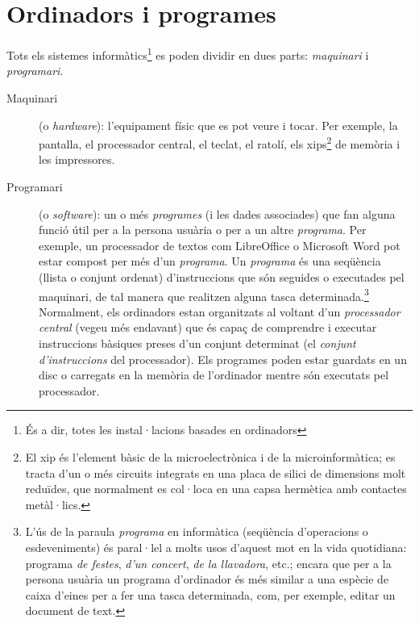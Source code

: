 \chapter{Ordinadors i programes}

\label{se:OiP}

Tots els sistemes informàtics\footnote{És a dir, totes les
  instal·lacions basades en ordinadors} es poden dividir en dues
parts: \emph{maquinari} i \emph{programari}.

\begin{description}
\item[Maquinari] (o \emph{hardware}): l'equipament físic que es pot
  veure i tocar. Per exemple, la pantalla, el processador central, el
  teclat, el ratolí, els xips\footnote{El xip és l'element bàsic de la
    microelectrònica i de la microinformàtica; es tracta d'un o més
    circuits integrats en una placa de silici de dimensions molt
    reduïdes, que normalment es col·loca en una capsa hermètica amb
    contactes metàl·lics.}  de memòria i les impressores.

\item[Programari] (o \emph{software}): un o més \emph{programes} (i
  les dades associades) que fan alguna funció útil per a la persona
  usuària o per a un altre \emph{programa}.  Per exemple, un
  processador de textos com LibreOffice o Microsoft Word pot estar
  compost per més d'un \emph{programa}. Un \emph{programa} és una
  seqüència (llista o conjunt ordenat) d'instruccions que són seguides
  o executades pel maquinari, de tal manera que realitzen alguna tasca
  determinada.\footnote{L'ús de la paraula \emph{programa} en
    informàtica (seqüència d'operacions o esdeveniments) és paral·lel
    a molts usos d'aquest mot en la vida quotidiana: programa \emph{de
      festes}, \emph{d'un concert}, \emph{de la llavadora}, etc.;
    encara que per a la persona usuària un programa d'ordinador és més
    similar a una espècie de caixa d'eines per a fer una tasca
    determinada, com, per exemple, editar un document de text.}
  Normalment, els ordinadors estan organitzats al voltant d'un
  \emph{processador central} (vegeu més endavant) que és capaç de
  comprendre i executar instruccions bàsiques preses d'un conjunt
  determinat (el \emph{conjunt d'instruccions} del processador).  Els
  programes poden estar %
  guardats en un disc o carregats en la memòria de l'ordinador mentre
  són executats pel processador.
\end{description}

